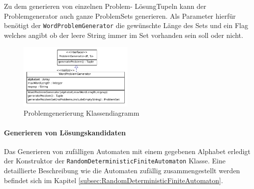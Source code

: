 Zu dem generieren von einzelnen \flqq Problem\frqq - \flqq Lösung\frqq Tupeln kann der Problemgenerator auch ganze ProblemSets generieren. Als Parameter hierfür benötigt der \lstinline$WordProblemGenerator$ die gewünschte Länge des Sets und ein Flag welches angibt ob der leere String immer im Set vorhanden sein soll oder nicht.

\begin{figure}[h]
  \centering
  \includegraphics[width=0.5\textwidth]{images/simple_uml_pg.pdf}
  \caption[Problemgenerierung Klassendiagramm]{Problemgenerierung Klassendiagramm}
  \label{fig:ea_pg_classdiag_simple}
\end{figure}


\paragraph{Generieren von Lösungskandidaten}
Das Generieren von zufälligen Automaten mit einem gegebenen Alphabet erledigt der Konstruktor der \lstinline$RandomDeterministicFiniteAutomaton$ Klasse. Eine detaillierte Beschreibung wie die Automaten zufällig zusammengestellt werden befindet sich im Kapitel \ref{subsec:RandomDeterministicFiniteAutomaton}.
